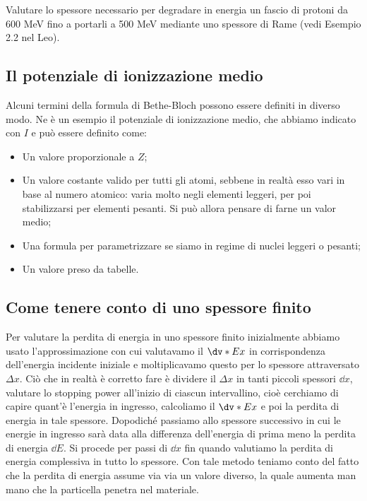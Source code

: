 \begin{esercizio}
    Valutare lo spessore necessario per degradare in energia un fascio di protoni da 600 MeV fino a portarli a 500 MeV mediante uno spessore di Rame (vedi Esempio 2.2 nel Leo).
\end{esercizio}

\subsection*{Il potenziale di ionizzazione medio}

Alcuni termini della formula di Bethe-Bloch possono essere definiti in diverso modo. Ne è un esempio il potenziale di ionizzazione medio, che abbiamo indicato con $I$ e può essere definito come:

\begin{itemize}
    \item Un valore proporzionale a $Z$;
    \item Un valore costante valido per tutti gli atomi, sebbene in realtà esso vari in base al numero atomico: varia molto negli elementi leggeri, per poi stabilizzarsi per elementi pesanti. Si può allora pensare di farne un valor medio;
    \item Una formula per parametrizzare se siamo in regime di nuclei leggeri o pesanti;
    \item Un valore preso da tabelle.
\end{itemize}

\subsection*{Come tenere conto di uno spessore finito}

Per valutare la perdita di energia in uno spessore finito inizialmente abbiamo usato l'approssimazione con cui valutavamo il $\dv*{E}{x}$ in corrispondenza dell'energia incidente iniziale e moltiplicavamo questo per lo spessore attraversato $\Delta x$. Ciò che in realtà è corretto fare è dividere il $\Delta x$ in tanti piccoli spessori $\dd{x}$, valutare lo stopping power all'inizio di ciascun intervallino, cioè cerchiamo di capire quant'è l'energia in ingresso, calcoliamo il $\dv*{E}{x}$ e poi la perdita di energia in tale spessore. Dopodiché passiamo allo spessore successivo in cui le energie in ingresso sarà data alla differenza dell'energia di prima meno la perdita di energia $\dd{E}$. Si procede per passi di $\dd{x}$ fin quando valutiamo la perdita di energia complessiva in tutto lo spessore. Con tale metodo teniamo conto del fatto che la perdita di energia assume via via un valore diverso, la quale aumenta man mano che la particella penetra nel materiale.